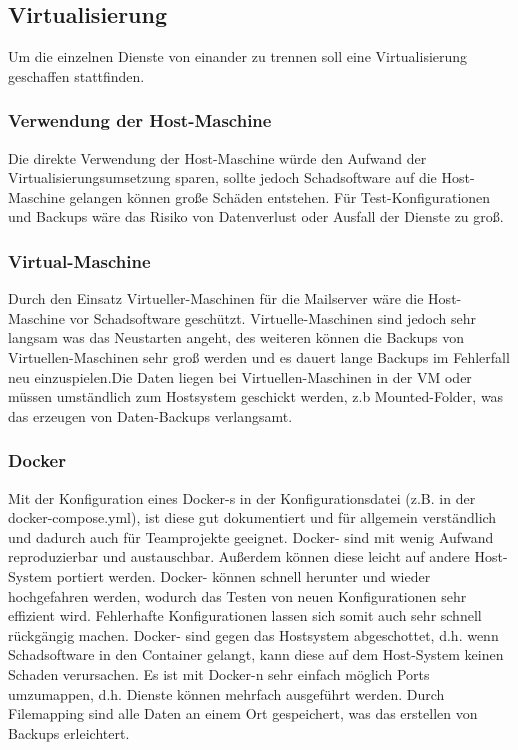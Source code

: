 \documentclass[a4paper,11pt,singlespacing]{article}
\begin{document}
		

	\subsection{Virtualisierung}\label{sec:Virtualisierung}
		Um die einzelnen Dienste von einander zu trennen soll eine Virtualisierung geschaffen stattfinden.

		\subsubsection{Verwendung der Host-Maschine}\label{Verwendung der Host-Maschine}
			Die direkte Verwendung der Host-Maschine würde den Aufwand der Virtualisierungsumsetzung sparen, sollte jedoch Schadsoftware auf die Host-Maschine gelangen können große Schäden entstehen. Für Test-Konfigurationen und Backups wäre das Risiko von Datenverlust oder Ausfall der Dienste zu groß.

		\subsubsection{Virtual-Maschine}\label{Virtual-Maschine}
			Durch den Einsatz Virtueller-Maschinen für die Mailserver wäre die Host-Maschine vor Schadsoftware geschützt. Virtuelle-Maschinen sind jedoch sehr langsam was das Neustarten angeht, des weiteren können die Backups von Virtuellen-Maschinen sehr groß werden und es dauert lange Backups im Fehlerfall neu einzuspielen.Die Daten liegen bei Virtuellen-Maschinen in der VM oder müssen umständlich zum Hostsystem geschickt werden, z.b Mounted-Folder, was das erzeugen von Daten-Backups verlangsamt.

		\subsubsection{Docker}\label{Docker}
			Mit der Konfiguration eines Docker-s in der Konfigurationsdatei (z.B. in der docker-compose.yml), ist diese gut dokumentiert und für allgemein verständlich und dadurch auch für Teamprojekte geeignet.
Docker- sind mit wenig Aufwand reproduzierbar und austauschbar. Außerdem können diese leicht auf andere Host-System portiert werden. Docker- können schnell herunter und wieder hochgefahren werden, wodurch das Testen von neuen Konfigurationen sehr effizient wird. Fehlerhafte Konfigurationen lassen sich somit auch sehr schnell rückgängig machen. Docker- sind gegen das Hostsystem abgeschottet, d.h. wenn Schadsoftware in den Container gelangt, kann diese auf dem Host-System keinen Schaden verursachen. Es ist mit Docker-n sehr einfach möglich Ports umzumappen, d.h. Dienste können mehrfach ausgeführt werden. Durch Filemapping sind alle Daten an einem Ort gespeichert, was das erstellen von Backups erleichtert.
\end{document}
